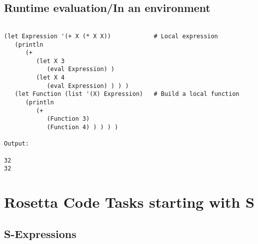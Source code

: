 \section*{Runtime evaluation/In an environment}

\begin{verbatim}

(let Expression '(+ X (* X X))            # Local expression
   (println
      (+
         (let X 3
            (eval Expression) )
         (let X 4
            (eval Expression) ) ) )
   (let Function (list '(X) Expression)   # Build a local function
      (println
         (+
            (Function 3)
            (Function 4) ) ) ) )

Output:

32
32

\end{verbatim}

\chapter{Rosetta Code Tasks starting with S}

\section*{S-Expressions}

